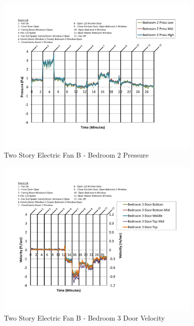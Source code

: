 \documentclass{article}
\begin{document}
\begin{appendices}
	\begin{figure}[H]
		\centering
		\includegraphics[height=3.05in,trim=0.67in 1.1in 0.67in 0.8in,clip=true]{0_Images/Results_Charts/ColdFlow/Two_Story/Electric/B/Bedroom_2_Pressure.pdf}
		\caption{Two Story Electric Fan B - Bedroom 2 Pressure}
	\end{figure}
 

	\begin{figure}[H]
		\centering
		\includegraphics[height=3.05in,trim=0.67in 1.1in 0.67in 0.8in,clip=true]{0_Images/Results_Charts/ColdFlow/Two_Story/Electric/B/Bedroom_3_Door_Velocity.pdf}
		\caption{Two Story Electric Fan B - Bedroom 3 Door Velocity}
	\end{figure}
 
	\clearpage


\end{appendices}
\end{document}

